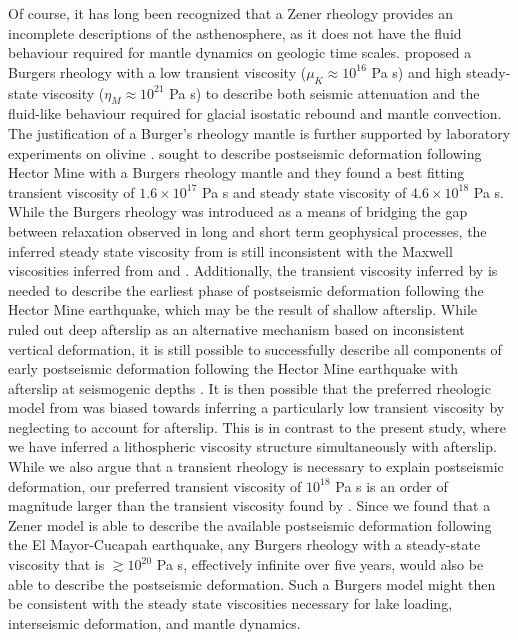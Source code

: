 \documentclass[1p]{elsarticle}
\begin{document}
Of course, it has long been recognized that a Zener rheology provides an incomplete descriptions of the asthenosphere, as it does not have the fluid behaviour required for mantle dynamics on geologic time scales. \citet{Yuen1982} proposed a Burgers rheology with a low transient viscosity ($\mu_K\approx10^{16}$ Pa s) and high steady-state viscosity ($\eta_M\approx10^{21}$ Pa s) to describe both seismic attenuation and the fluid-like behaviour required for glacial isostatic rebound and mantle convection.  The justification of a Burger's rheology mantle is further supported by laboratory experiments on olivine \citep{Chopra1997}. \citet{Pollitz2003} sought to describe postseismic deformation following Hector Mine with a Burgers rheology mantle and they found a best fitting transient viscosity of $1.6\times10^{17}$ Pa s and steady state viscosity of $4.6\times10^{18}$ Pa s. While the Burgers rheology was introduced as a means of bridging the gap between relaxation observed in long and short term geophysical processes, the inferred steady state viscosity from \citet{Pollitz2003} is still inconsistent with the Maxwell viscosities inferred from \citet{Lundgren2009} and \citet{Luttrell2007}. Additionally, the transient viscosity inferred by \citet{Pollitz2003} is needed to describe the earliest phase of postseismic deformation following the Hector Mine earthquake, which may be the result of shallow afterslip. While \citet{Pollitz2003} ruled out deep afterslip as an alternative mechanism based on inconsistent vertical deformation, it is still possible to successfully describe all components of early postseismic deformation following the Hector Mine earthquake with afterslip at seismogenic depths \citep{Jacobs2002}. It is then possible that the preferred rheologic model from \citet{Pollitz2003} was biased towards inferring a particularly low transient viscosity by neglecting to account for afterslip.  This is in contrast to the present study, where we have inferred a lithospheric viscosity structure simultaneously with afterslip. While we also argue that a transient rheology is necessary to explain postseismic deformation, our preferred transient viscosity of $10^{18}$ Pa s is an order of magnitude larger than the transient viscosity found by \cite{Pollitz2003}.  Since we found that a Zener model is able to describe the available postseismic deformation following the El Mayor-Cucapah earthquake, any Burgers rheology with a steady-state viscosity that is $\gtrsim10^{20}$ Pa s, effectively infinite over five years, would also be able to describe the postseismic deformation. Such a Burgers model might then be consistent with the steady state viscosities necessary for lake loading, interseismic deformation, and mantle dynamics.
\end{document}
